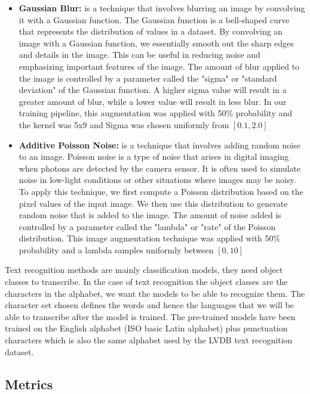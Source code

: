 \begin{itemize}
    \item \textbf{Gaussian Blur:} is a technique that involves blurring an image by convolving it with a Gaussian function. The Gaussian function is a bell-shaped curve that represents the distribution of values in a dataset. By convolving an image with a Gaussian function, we essentially smooth out the sharp edges and details in the image. This can be useful in reducing noise and emphasizing important features of the image. The amount of blur applied to the image is controlled by a parameter called the "sigma" or "standard deviation" of the Gaussian function. A higher sigma value will result in a greater amount of blur, while a lower value will result in less blur. In our training pipeline, this augmentation was applied with 50\% probability and the kernel was 5x9 and Sigma was chosen uniformly from $[0.1, 2.0]$
    \item \textbf{Additive Poisson Noise:} is a technique that involves adding random noise to an image. Poisson noise is a type of noise that arises in digital imaging when photons are detected by the camera sensor. It is often used to simulate noise in low-light conditions or other situations where images may be noisy. To apply this technique, we first compute a Poisson distribution based on the pixel values of the input image. We then use this distribution to generate random noise that is added to the image. The amount of noise added is controlled by a parameter called the "lambda" or "rate" of the Poisson distribution. This image augmentation technique was applied with 50\% probability and a lambda samples uniformly between $[0, 10]$

\end{itemize}

Text recognition methods are mainly classification models, they need object classes to transcribe. In the case of text recognition the object classes are the characters in the alphabet, we want the models to be able to recognize them. The character set chosen defines the words and hence the languages that we will be able to transcribe after the model is trained. The pre-trained models have been trained on the English alphabet (ISO basic Latin alphabet) plus punctuation characters which is also the same alphabet used by the LVDB text recognition dataset.

\subsection{Metrics}

